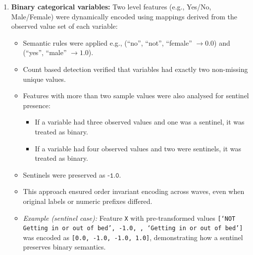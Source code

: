 \begin{enumerate}
    \item \textbf{Binary categorical variables:} Two level features (e.g., Yes/No, Male/Female) were dynamically encoded using mappings derived from the observed value set of each variable:
    \begin{itemize}
        \item[-] Semantic rules were applied e.g., (``no'', ``not'', ``female'' $\to 0.0$) and (``yes'', ``male'' $\to 1.0$).  
        \item[-] Count based detection verified that variables had exactly two non-missing unique values.  
        \item[-] Features with more than two sample values were also analysed for sentinel presence:
        \begin{itemize}
        \item[-] If a variable had three observed values and one was a sentinel, it was treated as binary.  
        \item[-] If a variable had four observed values and two were sentinels, it was treated as binary.  
        \end{itemize}
        \item[-] Sentinels were preserved as $\texttt{-1.0}$.  
        \item[-] This approach ensured order invariant encoding across waves, even when original labels or numeric prefixes differed.
        \item[-] \textit{Example (sentinel case):} Feature \texttt{X} with pre-transformed values \texttt{[`NOT Getting in or out of bed', -1.0, , `Getting in or out of bed']} was encoded as \texttt{[0.0, -1.0, -1.0, 1.0]}, demonstrating how a sentinel preserves binary semantics.
    \end{itemize}


\end{enumerate}
